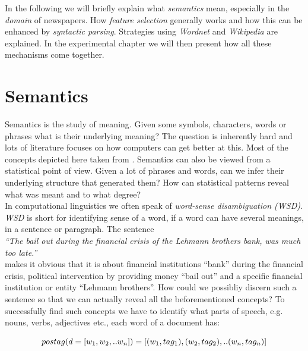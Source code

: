 In the following we will briefly explain what \emph{semantics} mean, especially in the \emph{domain} of newspapers. How \emph{feature selection} generally works and how this can be enhanced by \emph{syntactic parsing}. Strategies using \emph{Wordnet} and \emph{Wikipedia} are explained. In the experimental chapter we will then present how all these mechanisms come together.


\section{Semantics}
\label{sec:semantics}
  
  Semantics is the study of meaning. Given some symbols, characters, words or phrases what is their underlying meaning? The question is inherently hard and lots of literature focuses on how computers can get better at this. Most of the concepts depicted here taken from \cite{NLPBookJurafsky2000}. Semantics can also be viewed from a statistical point of view. Given a lot of phrases and words, can we infer their underlying structure that generated them? How can statistical patterns reveal what was meant and to what degree?\\
  In computational linguistics we often speak of \emph{word-sense disambiguation (WSD)}. \emph{WSD} is short for identifying sense of a word, if a word can have several meanings, in a sentence or paragraph. The sentence\\ 

    \emph{``The bail out during the financial crisis of the Lehmann brothers bank, was much too late.''}\\

  makes it obvious that it is about financial institutions ``bank'' during the financial crisis, political intervention by providing money ``bail out'' and a specific financial institution or entity ``Lehmann brothers''. How could we possibliy discern such a sentence so that we can actually reveal all the beforementioned concepts? To successfully find such concepts we have to identify what parts of speech, e.g. nouns, verbs, adjectives etc., each word of a document has:

    \begin{equation}
      pos\-tag(d=[w_1,w_2,..w_n]) = [(w_1, tag_1), (w_2, tag_2),.. (w_n, tag_n)]
    \end{equation}

